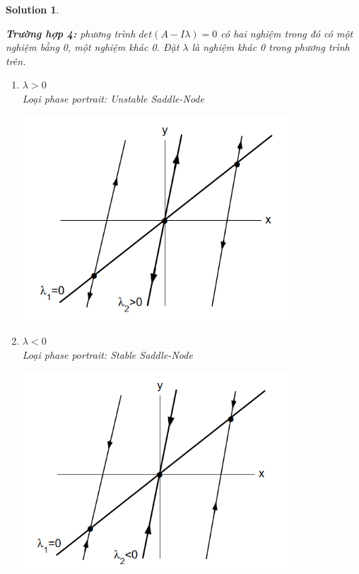 \documentclass[a4paper]{article}
\newtheorem*{sol}{Solution}
\begin{document}
\begin{sol}
\begin{enumerate}
\begin{center}
   \end{center}
\end{enumerate}
\textbf{Trường hợp 4:} phương trình $det(A - I \lambda)=0$ có hai nghiệm trong đó có một nghiệm bằng 0, một nghiệm khác 0. Đặt $\lambda$ là nghiệm khác 0  trong phương trình trên.
\begin{enumerate}
    \item $\lambda > 0$\\
    Loại phase portrait: Unstable Saddle-Node
    \begin{center}
        \includegraphics[width=100mm]{image/BT1/Unstable Saddle-Node.png}
   \end{center}
    \item $\lambda < 0$ \\
    Loại phase portrait: Stable Saddle-Node
    \begin{center}
        \includegraphics[width=100mm]{image/BT1/Stable Saddle-Node.png}
   \end{center}
\end{enumerate}
\begin{abstract}
    \begin{tabular}{|c|c|c|c|c|c|}

\end{tabular}
\end{abstract}
\end{sol}
\end{document}
